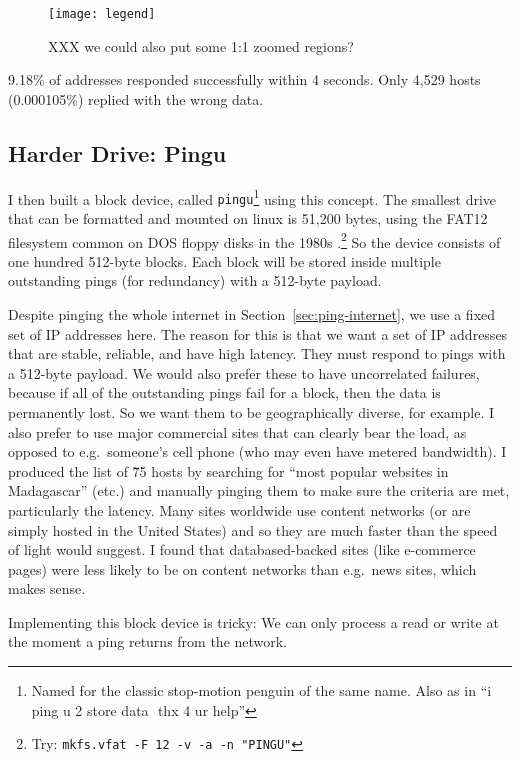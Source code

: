 \documentclass[twocolumn]{article}
\begin{document}
\begin{figure}[htp]
  \texttt{[image: legend]}
  \caption{ XXX we could also put some 1:1 zoomed regions? } \label{fig:internetlegend}
\end{figure}

9.18\% of addresses responded successfully within 4 seconds. Only
4,529 hosts (0.000105\%) replied with the wrong data.

\subsection{Harder Drive: Pingu} \label{sec:pingu}

I then built a block device, called {\tt pingu}\footnote{Named for the
  classic stop-motion penguin of the same name. Also as in ``i ping u
  2 store data\,\, thx 4 ur help''} using this concept. The smallest
drive that can be formatted and mounted on linux is 51,200 bytes,
using the FAT12 filesystem common on DOS floppy disks in the 1980s
\cite{wikipediafat12}.\!\footnote{ Try:
  \verb+mkfs.vfat -F 12 -v -a -n "PINGU"+ } So the device consists of
one hundred 512-byte blocks. Each block will be stored inside multiple
outstanding pings (for redundancy) with a 512-byte payload.

Despite pinging the whole internet in Section~\ref{sec:ping-internet},
we use a fixed set of IP addresses here. The reason for this is that
we want a set of IP addresses that are stable, reliable, and have high
latency. They must respond to pings with a 512-byte payload. We would
also prefer these to have uncorrelated failures, because if all of the
outstanding pings fail for a block, then the data is permanently lost.
So we want them to be geographically diverse, for example. I also
prefer to use major commercial sites that can clearly bear the load,
as opposed to e.g.~someone's cell phone (who may even have metered
bandwidth). I produced the list of \~75 hosts by searching for ``most
popular websites in Madagascar'' (etc.) and manually pinging them to
make sure the criteria are met, particularly the latency. Many sites
worldwide use content networks (or are simply hosted in the United
States) and so they are much faster than the speed of light would
suggest. I found that databased-backed sites (like e-commerce pages)
were less likely to be on content networks than e.g.~news sites, which
makes sense.

Implementing this block device is tricky: We can only process a read
or write at the moment a ping returns from the network.
\end{document}
